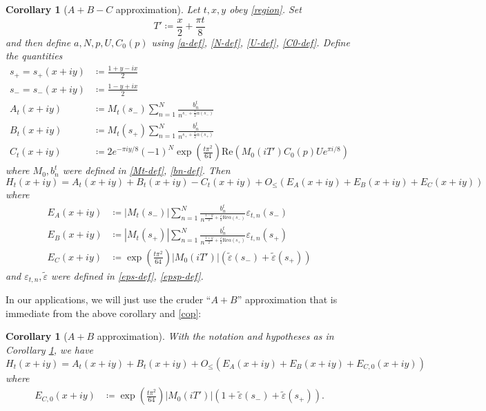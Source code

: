 \documentclass[a4paper,11pt,twoside]{amsart}
\newtheorem{corollary}[theorem]{Corollary}
\newcommand\eps{\varepsilon}
\begin{document}
\begin{corollary}[$A+B-C$ approximation]\label{abc-cor}  Let $t,x,y$ obey \eqref{region}.  Set
\begin{equation}\label{tp-def}
 T' \coloneqq \frac{x}{2} + \frac{\pi t}{8} 
\end{equation}
and then define $a,N,p,U,C_0(p)$ using \eqref{a-def}, \eqref{N-def}, \eqref{U-def}, \eqref{C0-def}.  Define the quantities
\begin{align*}
s_+ = s_+(x+iy) &\coloneqq \frac{1+y-ix}{2} \\
s_- = s_-(x+iy) &\coloneqq \frac{1-y+ix}{2} \\
A_t(x+iy) &\coloneqq M_t(s_-) \sum_{n=1}^N \frac{b_n^t}{n^{s_- +\frac{t}{2} \alpha(s_-)}}  \\
B_t(x+iy) &\coloneqq M_t(s_+) \sum_{n=1}^N \frac{b_n^t}{n^{s_+ +\frac{t}{2} \alpha(s_+)}}  \\
C_t(x+iy) &\coloneqq  2 e^{-\pi i y/8} (-1)^{N} \exp\left( \frac{t \pi^2}{64}\right) \mathrm{Re}( M_0(iT') C_0(p) U e^{\pi i/8} )
\end{align*}
where $M_0, b_n^t$ were defined in \eqref{Mt-def}, \eqref{bn-def}.
Then
$$ H_t(x+iy) = A_t(x+iy) + B_t(x+iy) - C_t(x+iy) + O_{\leq}(E_A(x+iy) + E_B(x+iy) + E_C(x+iy))$$
where
\begin{align*}
E_A(x+iy) &\coloneqq \left|M_t(s_-)\right| \sum_{n=1}^N \frac{b_n^t}{n^{\frac{1-y}{2}+\frac{t}{2} \mathrm{Re} \alpha(s_-)}} \eps_{t,n}(s_-) \\
E_B(x+iy) &\coloneqq \left|M_t(s_+)\right|\sum_{n=1}^N  \frac{b_n^t}{n^{\frac{1+y}{2}+\frac{t}{2} \mathrm{Re} \alpha(s_+)}} \eps_{t,n}(s_+)  \\
E_C(x+iy) &\coloneqq \exp\left( \frac{t \pi^2}{64}\right) |M_0(iT')| \left(\tilde \eps(s_-) + \tilde \eps(s_+)\right)  
\end{align*}
and $\eps_{t,n}, \tilde \eps$ were defined in \eqref{eps-def}, \eqref{epsp-def}. 
\end{corollary}

In our applications, we will just use the cruder ``$A+B$'' approximation that is immediate from the above corollary and \eqref{cop}:

\begin{corollary}[$A+B$ approximation]\label{ab-cor} With the notation and hypotheses as in Corollary \ref{abc-cor}, we have
$$ H_t(x+iy) = A_t(x+iy) + B_t(x+iy) + O_{\leq}(E_A(x+iy) + E_B(x+iy) + E_{C,0}(x+iy))$$
where
\begin{align*}
E_{C,0}(x+iy) &\coloneqq \exp\left( \frac{t \pi^2}{64}\right) |M_0(iT')| \left(1 + \tilde \eps(s_-) + \tilde \eps(s_+)\right). 
\end{align*}
\end{corollary}
\end{document}
